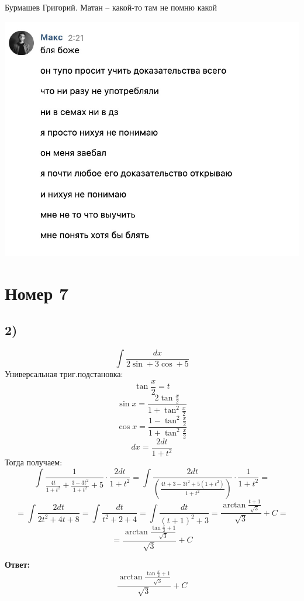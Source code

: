 \documentclass[a4paper,12pt]{article}
\author{Бурмашев Григорий, БПМИ-208}
\title{}
\date{\today}
\begin{document}
\begin{center}
Бурмашев Григорий. Матан -- какой-то там не помню какой
\end{center}
\includegraphics[scale=0.4]{1.jpg}
\clearpage
\section*{Номер 7}
\subsection*{2)}
\[
\int \frac{dx}{2\sin + 3\cos + 5} 
\]
Универсальная триг.подстановка:
\[
\tan \frac{x}{2} = t
\]
\[
\sin x = \frac{2 \tan \frac{x}{2}}{1 + \tan^2 \frac{x}{2}}
\]
\[
\cos x = \frac{ 1 - \tan^2 \frac{x}{2}}{1 + \tan^2 \frac{x}{2}}
\]
\[
dx = \frac{2dt}{1 + t^2}
\]
Тогда получаем:
\[
\int \frac{1}{ \frac{4t}{1 + t^2} + \frac{3-3t^2}{1+t^2} + 5} \cdot \frac{2dt}{1 + t^2} = \int \frac{2dt}{\left( \frac{4t + 3 - 3t^2 + 5(1+t^2)}{1 + t^2}\right)} \cdot \frac{1}{1 + t^2} = 
\]
\[
= \int \frac{2dt}{2t^2 + 4t + 8} = \int \frac{dt}{t^2 + 2 + 4} = \int \frac{dt}{(t+ 1)^2 + 3} = \frac{\arctan \frac{t+1}{\sqrt{3}}}{\sqrt{3}} + C = 
\]
\[
= \frac{\arctan \frac{\tan \frac{x}{2}+1}{\sqrt{3}}}{\sqrt{3}} + C
\]
\begin{center}
\textbf{Ответ: } 
\[
\frac{\arctan \frac{\tan \frac{x}{2}+1}{\sqrt{3}}}{\sqrt{3}} + C
\]
\end{center}
\end{document}
